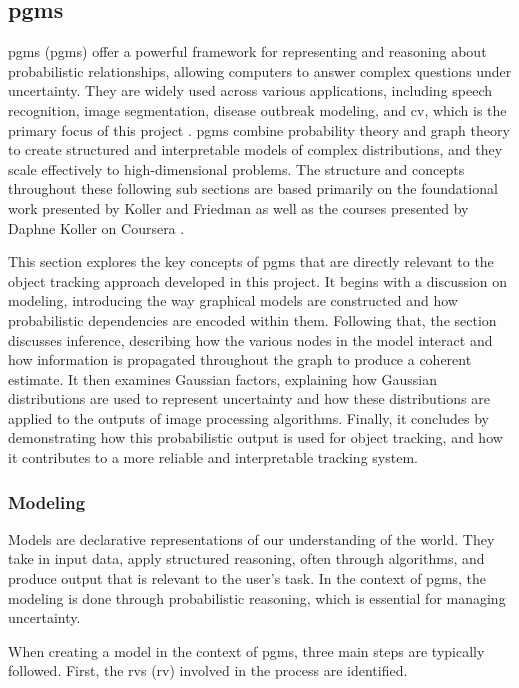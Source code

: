 \documentclass[12pt,a4paper]{article}
\begin{document}
\subsection{\acl{pgm}s}
\acl{pgm}s (\acs{pgm}s) offer a powerful framework for representing and reasoning about probabilistic relationships, allowing computers to answer complex questions under uncertainty. They are widely used across various applications, including speech recognition, image segmentation, disease outbreak modeling, and \acs{cv}, which is the primary focus of this project \parencite{koller2009pgm}. \acs{pgm}s combine probability theory and graph theory to create structured and interpretable models of complex distributions, and they scale effectively to high-dimensional problems. The structure and concepts throughout these following sub sections are based primarily on the foundational work presented by Koller and Friedman\parencite{koller2009pgm} as well as the courses presented by Daphne Koller on Coursera \parencite{kollerVideoGen1, kollerVideoGen2}.

This section explores the key concepts of \acs{pgm}s that are directly relevant to the object tracking approach developed in this project. It begins with a discussion on modeling, introducing the way graphical models are constructed and how probabilistic dependencies are encoded within them. Following that, the section discusses inference, describing how the various nodes in the model interact and how information is propagated throughout the graph to produce a coherent estimate. It then examines Gaussian factors, explaining how Gaussian distributions are used to represent uncertainty and how these distributions are applied to the outputs of image processing algorithms. Finally, it concludes by demonstrating how this probabilistic output is used for object tracking, and how it contributes to a more reliable and interpretable tracking system.

\subsubsection{Modeling}
Models are declarative representations of our understanding of the world. They take in input data, apply structured reasoning, often through algorithms, and produce output that is relevant to the user’s task. In the context of \acs{pgm}s, the modeling is done through probabilistic reasoning, which is essential for managing uncertainty.

When creating a model in the context of \acs{pgm}s, three main steps are typically followed. First, the \acl{rv}s (\acs{rv}) involved in the process are identified.
\end{document}

